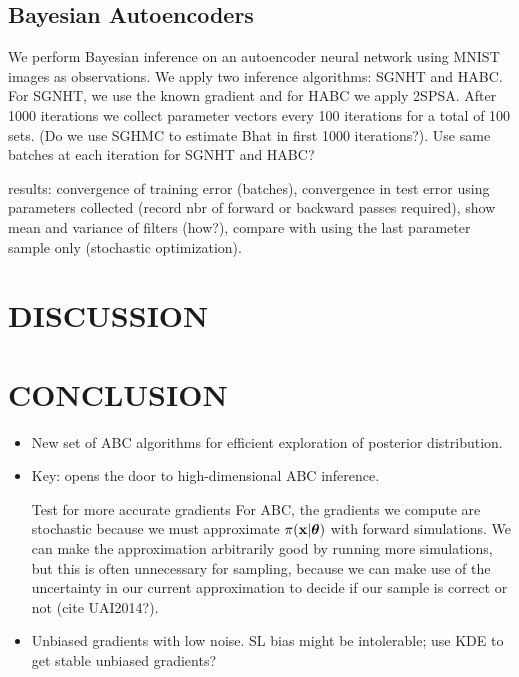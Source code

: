 \documentclass[]{article}
\begin{document}
\subsection{Bayesian Autoencoders}\label{sec:auto}
We perform Bayesian inference on an autoencoder neural network using MNIST images as observations.  We apply two inference algorithms: SGNHT and HABC.  For SGNHT, we use the known gradient and for HABC we apply 2SPSA.  After 1000 iterations we collect parameter vectors every 100 iterations for a total of 100 sets. (Do we use SGHMC to estimate Bhat in first 1000 iterations?).  Use same batches at each iteration for SGNHT and HABC? 

results: convergence of training error (batches), convergence in test error using parameters collected (record nbr of forward or backward passes required), show mean and variance of filters (how?), compare with using the last parameter sample only (stochastic optimization).





\section{DISCUSSION} \label{sec:discussion}


\section{CONCLUSION} \label{sec:conclusion}

\begin{itemize}
  \item New set of ABC algorithms for efficient exploration of posterior distribution.
  \item Key: opens the door to high-dimensional ABC inference.
  \item [Test for more accurate gradients] For ABC, the gradients we compute are stochastic because we must approximate $\pi({\bf x} | {\bm \theta})$ with forward simulations.  We can make the approximation arbitrarily good by running more simulations, but this is often unnecessary for sampling, because we can make use of the uncertainty in our current approximation to decide if our sample is correct or not (cite UAI2014?). 
  \item Unbiased gradients with low noise.  SL bias might be intolerable; use KDE to get stable unbiased gradients?
\end{itemize}
\end{document}
